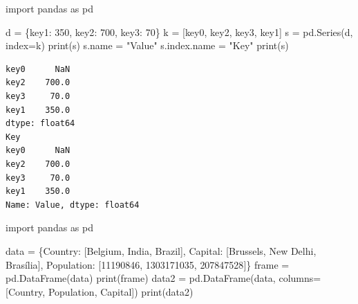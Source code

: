 \documentclass[
  english,
  letterpaper,
  DIV=11,
  numbers=noendperiod]{scrreprt}
\newenvironment{Shaded}{\begin{snugshade}}{\end{snugshade}}
\newcommand{\BuiltInTok}[1]{\textcolor[rgb]{0.00,0.23,0.31}{#1}}
\newcommand{\DecValTok}[1]{\textcolor[rgb]{0.68,0.00,0.00}{#1}}
\newcommand{\ImportTok}[1]{\textcolor[rgb]{0.00,0.46,0.62}{#1}}
\newcommand{\NormalTok}[1]{\textcolor[rgb]{0.00,0.23,0.31}{#1}}
\newcommand{\OperatorTok}[1]{\textcolor[rgb]{0.37,0.37,0.37}{#1}}
\newcommand{\StringTok}[1]{\textcolor[rgb]{0.13,0.47,0.30}{#1}}
\begin{document}
\begin{Shaded}
\begin{Highlighting}[]
\ImportTok{import}\NormalTok{ pandas }\ImportTok{as}\NormalTok{ pd}

\NormalTok{d }\OperatorTok{=}\NormalTok{ \{}\StringTok{\textquotesingle{}key1\textquotesingle{}}\NormalTok{: }\DecValTok{350}\NormalTok{, }\StringTok{\textquotesingle{}key2\textquotesingle{}}\NormalTok{: }\DecValTok{700}\NormalTok{, }\StringTok{\textquotesingle{}key3\textquotesingle{}}\NormalTok{: }\DecValTok{70}\NormalTok{\}}
\NormalTok{k }\OperatorTok{=}\NormalTok{ [}\StringTok{\textquotesingle{}key0\textquotesingle{}}\NormalTok{, }\StringTok{\textquotesingle{}key2\textquotesingle{}}\NormalTok{, }\StringTok{\textquotesingle{}key3\textquotesingle{}}\NormalTok{, }\StringTok{\textquotesingle{}key1\textquotesingle{}}\NormalTok{]}
\NormalTok{s }\OperatorTok{=}\NormalTok{ pd.Series(d, index}\OperatorTok{=}\NormalTok{k)}
\BuiltInTok{print}\NormalTok{(s)}
\NormalTok{s.name }\OperatorTok{=} \StringTok{"Value"}
\NormalTok{s.index.name }\OperatorTok{=} \StringTok{"Key"}
\BuiltInTok{print}\NormalTok{(s)}
\end{Highlighting}
\end{Shaded}

\begin{verbatim}
key0      NaN
key2    700.0
key3     70.0
key1    350.0
dtype: float64
Key
key0      NaN
key2    700.0
key3     70.0
key1    350.0
Name: Value, dtype: float64
\end{verbatim}

\begin{Shaded}
\begin{Highlighting}[]
\ImportTok{import}\NormalTok{ pandas }\ImportTok{as}\NormalTok{ pd}

\NormalTok{data }\OperatorTok{=}\NormalTok{ \{}\StringTok{\textquotesingle{}Country\textquotesingle{}}\NormalTok{: [}\StringTok{\textquotesingle{}Belgium\textquotesingle{}}\NormalTok{, }\StringTok{\textquotesingle{}India\textquotesingle{}}\NormalTok{, }\StringTok{\textquotesingle{}Brazil\textquotesingle{}}\NormalTok{],}
        \StringTok{\textquotesingle{}Capital\textquotesingle{}}\NormalTok{: [}\StringTok{\textquotesingle{}Brussels\textquotesingle{}}\NormalTok{, }\StringTok{\textquotesingle{}New Delhi\textquotesingle{}}\NormalTok{, }\StringTok{\textquotesingle{}Brasília\textquotesingle{}}\NormalTok{],}
        \StringTok{\textquotesingle{}Population\textquotesingle{}}\NormalTok{: [}\DecValTok{11190846}\NormalTok{, }\DecValTok{1303171035}\NormalTok{, }\DecValTok{207847528}\NormalTok{]\}}
\NormalTok{frame }\OperatorTok{=}\NormalTok{ pd.DataFrame(data)}
\BuiltInTok{print}\NormalTok{(frame)}
\NormalTok{data2 }\OperatorTok{=}\NormalTok{ pd.DataFrame(data, columns}\OperatorTok{=}\NormalTok{[}\StringTok{\textquotesingle{}Country\textquotesingle{}}\NormalTok{, }\StringTok{\textquotesingle{}Population\textquotesingle{}}\NormalTok{, }\StringTok{\textquotesingle{}Capital\textquotesingle{}}\NormalTok{])}
\BuiltInTok{print}\NormalTok{(data2)}
\end{Highlighting}
\end{Shaded}
\end{document}
